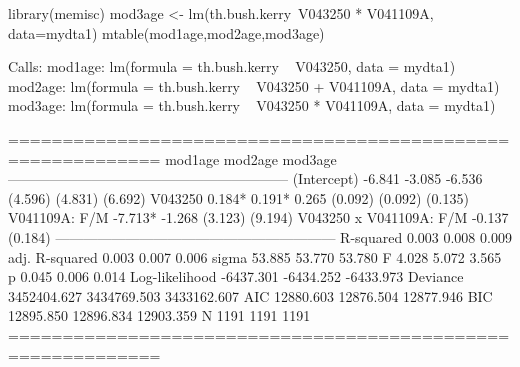\begin{Schunk}
\begin{Sinput}
 library(memisc) 
 mod3age <- lm(th.bush.kerry~V043250 * V041109A, data=mydta1)
 mtable(mod1age,mod2age,mod3age) 
\end{Sinput}
\begin{Soutput}
Calls:
mod1age: lm(formula = th.bush.kerry ~ V043250, data = mydta1)
mod2age: lm(formula = th.bush.kerry ~ V043250 + V041109A, data = mydta1)
mod3age: lm(formula = th.bush.kerry ~ V043250 * V041109A, data = mydta1)

============================================================
                           mod1age     mod2age     mod3age  
------------------------------------------------------------
(Intercept)                -6.841      -3.085      -6.536   
                           (4.596)     (4.831)     (6.692)  
V043250                     0.184*      0.191*      0.265   
                           (0.092)     (0.092)     (0.135)  
V041109A: F/M                          -7.713*     -1.268   
                                       (3.123)     (9.194)  
V043250 x V041109A: F/M                            -0.137   
                                                   (0.184)  
------------------------------------------------------------
R-squared                      0.003       0.008       0.009
adj. R-squared                 0.003       0.007       0.006
sigma                         53.885      53.770      53.780
F                              4.028       5.072       3.565
p                              0.045       0.006       0.014
Log-likelihood             -6437.301   -6434.252   -6433.973
Deviance                 3452404.627 3434769.503 3433162.607
AIC                        12880.603   12876.504   12877.946
BIC                        12895.850   12896.834   12903.359
N                           1191        1191        1191    
============================================================
\end{Soutput}
\end{Schunk}
